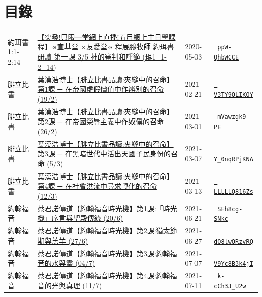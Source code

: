 \documentclass{book}
\begin{document}
\section{目錄}
\label{sec:index}
{ \scriptsize


\begin{xltabular}{\textwidth}{|p{0.15\textwidth} p{0.6\textwidth}|p{0.07\textwidth} p{0.1\textwidth}|}
\hline
約珥書 1:1-2:14 & \hyperref[sec:ppW_QhbWCCE]{【突發!只限一堂網上直播!五月網上主日學課程】※宣基堂 $\times$友愛堂※ 程展鵬牧師 約珥書研讀 第一課 3/5 神的審判和呼籲 (珥1\_1-2\_14)} & 2020-05-03 & \href{https://youtube.com/watch?v=ppW-QhbWCCE}{\texttt{ ppW-QhbWCCE}} \\
腓立比書   & \hyperref[sec:V3TY9OLIKOY]{葉漢浩博士【腓立比書品讀:夾縫中的召命】第1課 ─ 在帝國虛假價值中作辨別的召命 (19/2)} & 2021-02-21 & \href{https://youtube.com/watch?v=V3TY9OLIKOY}{\texttt{ V3TY9OLIKOY}} \\
腓立比書   & \hyperref[sec:mVawzgk9_PE]{葉漢浩博士【腓立比書品讀:夾縫中的召命】第2課 ─ 在帝國榮辱主義中作奴僕的召命 (26/2)} & 2021-03-01 & \href{https://youtube.com/watch?v=mVawzgk9-PE}{\texttt{ mVawzgk9-PE}} \\
腓立比書   & \hyperref[sec:Y_0nqRPjKNA]{葉漢浩博士【腓立比書品讀:夾縫中的召命】第3課 ─ 在黑暗世代中活出天國子民身份的召命 (5/3)} & 2021-03-07 & \href{https://youtube.com/watch?v=Y_0nqRPjKNA}{\texttt{ Y\_0nqRPjKNA}} \\
腓立比書   & \hyperref[sec:LLLLLQ816Zs]{葉漢浩博士【腓立比書品讀:夾縫中的召命】第4課 ─ 在社會洪流中尋求轉化的召命 (12/3)} & 2021-03-13 & \href{https://youtube.com/watch?v=LLLLLQ816Zs}{\texttt{ LLLLLQ816Zs}} \\
約翰福音   & \hyperref[sec:SEh8cg_SNkc]{蔡君諾傳道【約翰福音時光機】第1課:「時光機」序言與聖殿傳統 (20/6)} & 2021-06-21 & \href{https://youtube.com/watch?v=SEh8cg-SNkc}{\texttt{ SEh8cg-SNkc}} \\
約翰福音   & \hyperref[sec:dO8lwORzvRQ]{蔡君諾傳道【約翰福音時光機】第2課:猶太節期與羔羊 (27/6)} & 2021-06-27 & \href{https://youtube.com/watch?v=dO8lwORzvRQ}{\texttt{ dO8lwORzvRQ}} \\
約翰福音   & \hyperref[sec:V9Yc8B3k4jI]{蔡君諾傳道【約翰福音時光機】第3課:約翰福音的水與靈 (04/7)} & 2021-07-07 & \href{https://youtube.com/watch?v=V9Yc8B3k4jI}{\texttt{ V9Yc8B3k4jI}} \\
約翰福音   & \hyperref[sec:k_cCh3J_U2w]{蔡君諾傳道【約翰福音時光機】第4課:約翰福音的光與真理 (11/7)} & 2021-07-11 & \href{https://youtube.com/watch?v=k-cCh3J_U2w}{\texttt{ k-cCh3J\_U2w}} \\

\end{xltabular}}
\end{document}
